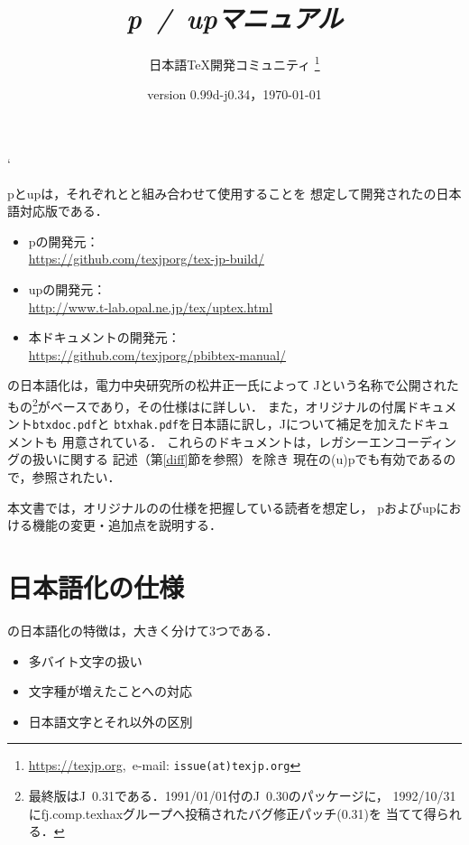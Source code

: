 \documentclass[a4paper,11pt,nomag,dvipdfmx]{jsarticle}
\def\file#1{\texttt{#1}}
\def\JBibTeX{\leavevmode\textcompwordmark\lower.5ex\hbox{J}\kern-.08em\BibTeX}
\def\pBibTeX{p\kern-.05em\BibTeX}
\def\upBibTeX{u\pBibTeX}
\def\JBibTeX{J\BibTeX}%
\def\pBibTeX{p\BibTeX}%
\def\upBibTeX{u\pBibTeX}%
\begin{document}
\catcode`
\title{\emph{\pBibTeX~/~\upBibTeX マニュアル}}
\author{日本語\TeX 開発コミュニティ\null
\thanks{\url{https://texjp.org},\ e-mail: \texttt{issue(at)texjp.org}}}
\date{version 0.99d-j0.34，\today}
\maketitle

\pBibTeX と\upBibTeX は，それぞれ\pTeX と\upTeX と組み合わせて使用することを
想定して開発された\BibTeX の日本語対応版である．
\begin{itemize}
  \item \pBibTeX の開発元：\\
    \url{https://github.com/texjporg/tex-jp-build/}
  \item \upBibTeX の開発元：\\
    \url{http://www.t-lab.opal.ne.jp/tex/uptex.html}
  \item 本ドキュメントの開発元：\\
    \url{https://github.com/texjporg/pbibtex-manual/}
\end{itemize}

\BibTeX の日本語化は，電力中央研究所の松井正一氏によって
\JBibTeX という名称で公開されたもの\footnote{%
最終版は\JBibTeX~0.31である．1991/01/01付の\JBibTeX~0.30のパッケージに，
1992/10/31にfj.comp.texhaxグループへ投稿されたバグ修正パッチ(0.31)を
当てて得られる．}がベースであり，その仕様は\cite{jbibtex}に詳しい．
また，オリジナルの\BibTeX 付属ドキュメント\file{btxdoc.pdf}と
\file{btxhak.pdf}を日本語に訳し，\JBibTeX について補足を加えたドキュメントも
用意されている\cite{jbtxdoc,jbtxhak}．
これらのドキュメントは，レガシーエンコーディングの扱いに関する
記述（第\ref{diff}節を参照）を除き
現在の(u)\pBibTeX でも有効であるので，参照されたい．

本文書では，オリジナルの\BibTeX の仕様を把握している読者を想定し，
\pBibTeX および\upBibTeX における機能の変更・追加点を説明する．

\tableofcontents
\clearpage

\section{日本語化の仕様}

\BibTeX の日本語化の特徴は，大きく分けて3つである．
\begin{itemize}
 \item 多バイト文字の扱い
 \item 文字種が増えたことへの対応
 \item 日本語文字とそれ以外の区別
\end{itemize}
\end{document}
